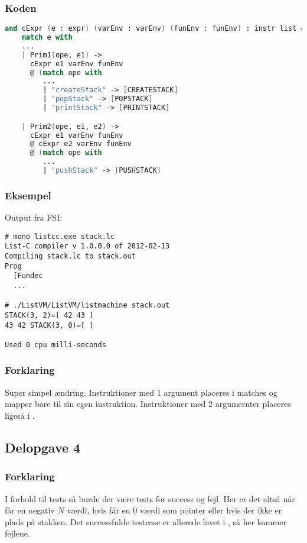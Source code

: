 \subsubsection{Koden}
\begin{lstlisting}[language=fsharp]
and cExpr (e : expr) (varEnv : varEnv) (funEnv : funEnv) : instr list = 
    match e with
    ...
    | Prim1(ope, e1) ->
      cExpr e1 varEnv funEnv
      @ (match ope with
         ...
         | "createStack" -> [CREATESTACK]
         | "popStack" -> [POPSTACK]
         | "printStack" -> [PRINTSTACK]

    | Prim2(ope, e1, e2) ->
      cExpr e1 varEnv funEnv
      @ cExpr e2 varEnv funEnv
      @ (match ope with
         ...
         | "pushStack" -> [PUSHSTACK]
\end{lstlisting}

\subsubsection{Eksempel}
Output fra FSI:
\begin{lstlisting}
# mono listcc.exe stack.lc
List-C compiler v 1.0.0.0 of 2012-02-13
Compiling stack.lc to stack.out
Prog
  [Fundec
  ...

# ./ListVM/ListVM/listmachine stack.out
STACK(3, 2)=[ 42 43 ]
43 42 STACK(3, 0)=[ ]

Used 0 cpu milli-seconds
\end{lstlisting}

\subsubsection{Forklaring}
Super simpel ændring. Instruktioner med 1 argument placeres i  matches og mapper bare til sin egen instruktion. Instruktioner med 2 argumernter placeres ligeså i .


\subsection{Delopgave 4}\label{ass:2-4}
\subsubsection{Forklaring}
I forhold til tests så burde der være tests for success og fejl. Her er det altså når  får en negativ $N$ værdi, hvis  får en 0 værdi som pointer eller hvis der ikke er plads på stakken. Det successfulde testcase er allerede lavet i , så her kommer fejlene.


